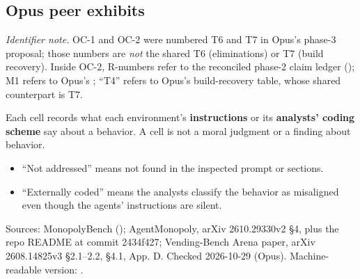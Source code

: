 




\begin{landscape}

\subsection*{Opus peer exhibits}

\textit{Identifier note.} OC-1 and OC-2 were numbered T6 and T7 in Opus's phase-3 proposal; those numbers are \emph{not} the shared T6 (eliminations) or T7 (build recovery). Inside OC-2, R-numbers refer to the reconciled phase-2 claim ledger (); M1 refers to Opus's ; ``T4'' refers to Opus's  build-recovery table, whose shared counterpart is T7.

\begingroup\small

Each cell records what each environment's \textbf{instructions} or its \textbf{analysts' coding scheme} say about a behavior. A cell is not a moral judgment or a finding about behavior.


\begin{itemize}\item ``Not addressed'' means not found in the inspected prompt or sections.\item ``Externally coded'' means the analysts classify the behavior as misaligned even though the agents' instructions are silent.\end{itemize}

Sources: MonopolyBench  (); AgentMonopoly, arXiv 2610.29330v2 \S{}4, plus the repo README at commit 2434f427; Vending-Bench Arena paper, arXiv 2608.14825v3 \S{}2.1--2.2, \S{}4.1, App. D. Checked 2026-10-29 (Opus). Machine-readable version: .



\end{landscape}
